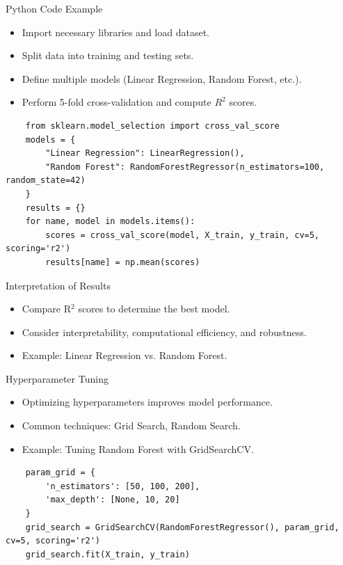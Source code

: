 \documentclass[11pt]{beamer}
\begin{document}
\begin{frame}[fragile]{Python Code Example}
    \begin{itemize}
        \item Import necessary libraries and load dataset.
        \item Split data into training and testing sets.
        \item Define multiple models (Linear Regression, Random Forest, etc.).
        \item Perform 5-fold cross-validation and compute $R^2$ scores.
    \end{itemize}
    \begin{verbatim}
    from sklearn.model_selection import cross_val_score
    models = {
        "Linear Regression": LinearRegression(),
        "Random Forest": RandomForestRegressor(n_estimators=100, random_state=42)
    }
    results = {}
    for name, model in models.items():
        scores = cross_val_score(model, X_train, y_train, cv=5, scoring='r2')
        results[name] = np.mean(scores)
    \end{verbatim}
\end{frame}

\begin{frame}{Interpretation of Results}
    \begin{itemize}
        \item Compare R$^2$ scores to determine the best model.
        \item Consider interpretability, computational efficiency, and robustness.
        \item Example: Linear Regression vs. Random Forest.
    \end{itemize}
\end{frame}

\begin{frame}[fragile]{Hyperparameter Tuning}
    \begin{itemize}
        \item Optimizing hyperparameters improves model performance.
        \item Common techniques: Grid Search, Random Search.
        \item Example: Tuning Random Forest with GridSearchCV.
    \end{itemize}
    \begin{verbatim}
    param_grid = {
        'n_estimators': [50, 100, 200],
        'max_depth': [None, 10, 20]
    }
    grid_search = GridSearchCV(RandomForestRegressor(), param_grid, cv=5, scoring='r2')
    grid_search.fit(X_train, y_train)
    \end{verbatim}
\end{frame}
\end{document}

